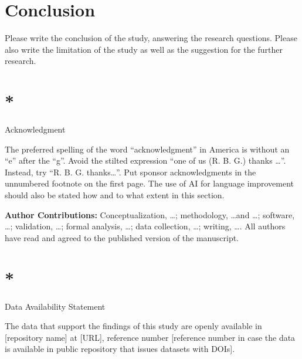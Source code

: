 \documentclass[10pt,conference,a4paper]{IEEEtran}
\let\oldsection\section
\renewcommand{\section}[1]{%
    \oldsection{#1}%
    \vspace{-4pt} %
}
\begin{document}
\section{Conclusion}

Please write the conclusion of the study, answering the research questions. Please also write the limitation of the study as well as the suggestion for the further research.

\section*{Acknowledgment}

The preferred spelling of the word ``acknowledgment'' in America is without an ``e'' after the ``g''. Avoid the stilted expression ``one of us (R. B. G.) thanks \ldots''. Instead, try ``R. B. G. thanks\ldots''. Put sponsor acknowledgments in the unnumbered footnote on the first page. The use of AI for language improvement should also be stated how and to what extent in this section.

\vspace{6pt}
\noindent\textbf{Author Contributions:} Conceptualization, \ldots; methodology, \ldots and \ldots; software, \ldots; validation, \ldots; formal analysis, \ldots; data collection, \ldots; writing, \ldots. All authors have read and agreed to the published version of the manuscript.

\section*{Data Availability Statement}

The data that support the findings of this study are openly available in [repository name] at [URL], reference number [reference number in case the data is available in public repository that issues datasets with DOIs].



\end{document}
